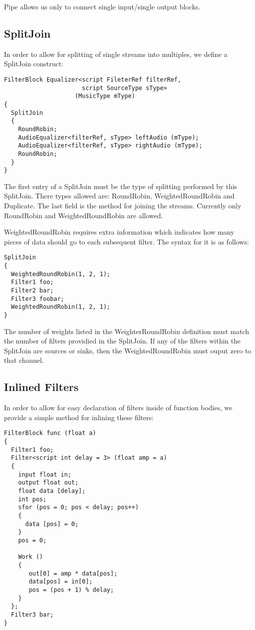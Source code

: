 \documentclass[draft]{article}
\begin{document}
Pipe allows us only to connect single input/single output blocks.

\subsection{SplitJoin}

In order to allow for splitting of single streams into multiples,
we define a SplitJoin construct:

\begin{verbatim}
FilterBlock Equalizer<script FileterRef filterRef,
                      script SourceType sType>
                    (MusicType mType)
{
  SplitJoin
  {
    RoundRobin;
    AudioEqualizer<filterRef, sType> leftAudio (mType);
    AudioEqualizer<filterRef, sType> rightAudio (mType);
    RoundRobin;
  }
}
\end{verbatim}

The first entry of a SplitJoin must be the type of splitting performed
by this SplitJoin.  There types allowed are:  RoundRobin, WeightedRoundRobin
and Duplicate.  The last field is the method for joining the streams.  
Currently only RoundRobin and WeightedRoundRobin are allowed.

WeightedRoundRobin requires extra information which indicates how many
pieces of data should go to each subsequent filter.  The syntax for it
is as follows:

\begin{verbatim}
SplitJoin
{
  WeightedRoundRobin(1, 2, 1);
  Filter1 foo;
  Filter2 bar;
  Filter3 foobar;
  WeightedRoundRobin(1, 2, 1);
}
\end{verbatim}

The number of weights listed in the WeighterRoundRobin definition must
match the number of filters providied in the SplitJoin.  If any of the
filters within the SplitJoin are sources or sinks, then the
WeightedRoundRobin must ouput zero to that channel.

\subsection{Inlined Filters}

In order to allow for easy declaration of filters inside of function
bodies, we provide a simple method for inlining these filters:

\begin{verbatim}
FilterBlock func (float a)
{
  Filter1 foo;
  Filter<script int delay = 3> (float amp = a)
  {
    input float in;
    output float out;
    float data [delay];
    int pos;
    sfor (pos = 0; pos < delay; pos++)
    {
      data [pos] = 0;
    }
    pos = 0;

    Work ()
    {
       out[0] = amp * data[pos];
       data[pos] = in[0];
       pos = (pos + 1) % delay;
    }
  };
  Filter3 bar;
}
\end{verbatim}
\end{document}
